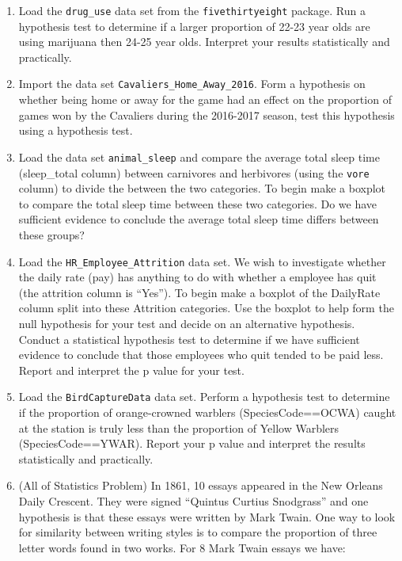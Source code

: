 \documentclass[
]{book}
\theoremstyle{definition}
\theoremstyle{definition}
\theoremstyle{definition}
\theoremstyle{definition}
\theoremstyle{remark}
\begin{document}
\begin{enumerate}
\def\labelenumi{\arabic{enumi}.}
\item
  Load the \texttt{drug\_use} data set from the \texttt{fivethirtyeight} package. Run a hypothesis test to determine if a larger proportion of 22-23 year olds are using marijuana then 24-25 year olds. Interpret your results statistically and practically.
\item
  Import the data set \texttt{Cavaliers\_Home\_Away\_2016}. Form a hypothesis on whether being home or away for the game had an effect on the proportion of games won by the Cavaliers during the 2016-2017 season, test this hypothesis using a hypothesis test.
\item
  Load the data set \texttt{animal\_sleep} and compare the average total sleep time (sleep\_total column) between carnivores and herbivores (using the \texttt{vore} column) to divide the between the two categories. To begin make a boxplot to compare the total sleep time between these two categories. Do we have sufficient evidence to conclude the average total sleep time differs between these groups?
\item
  Load the \texttt{HR\_Employee\_Attrition} data set. We wish to investigate whether the daily rate (pay) has anything to do with whether a employee has quit (the attrition column is ``Yes''). To begin make a boxplot of the DailyRate column split into these Attrition categories. Use the boxplot to help form the null hypothesis for your test and decide on an alternative hypothesis. Conduct a statistical hypothesis test to determine if we have sufficient evidence to conclude that those employees who quit tended to be paid less. Report and interpret the p value for your test.
\item
  Load the \texttt{BirdCaptureData} data set. Perform a hypothesis test to determine if the proportion of orange-crowned warblers (SpeciesCode==OCWA) caught at the station is truly less than the proportion of Yellow Warblers (SpeciesCode==YWAR). Report your p value and interpret the results statistically and practically.
\item
  (All of Statistics Problem) In 1861, 10 essays appeared in the New Orleans Daily Crescent. They were signed ``Quintus Curtius Snodgrass'' and one hypothesis is that these essays were written by Mark Twain. One way to look for similarity between writing styles is to compare the proportion of three letter words found in two works. For 8 Mark Twain essays we have:
\end{enumerate}
\end{document}

